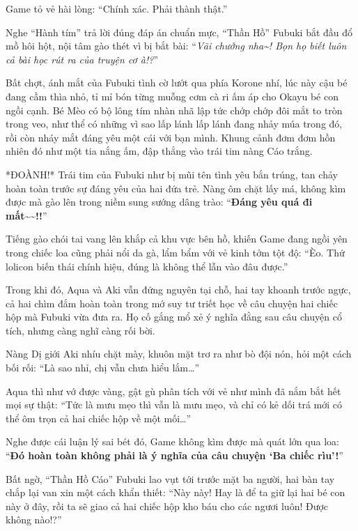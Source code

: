 \documentclass[../main.tex]{subfiles}
\begin{document}
Game tỏ vẻ hài lòng: ``Chính xác. Phải thành thật.''

Nghe ``Hành tím'' trả lời đúng đáp án chuẩn mực, ``Thần Hồ'' Fubuki bắt đầu đổ mồ hôi hột, nội tâm gào thét vì bị bắt bài: ``\textit{Vãi chưởng nha\~{}! Bọn họ biết luôn cả bài học rút ra của truyện cơ à!?}''

Bất chợt, ánh mắt của Fubuki tình cờ lướt qua phía Korone nhí, lúc này cậu bé đang cầm thìa nhỏ, tỉ mỉ bón từng muỗng cơm cà ri ấm áp cho Okayu bé con ngồi cạnh. Bé Mèo có bộ lông tím nhàn nhã lập tức chớp chớp đôi mắt to tròn trong veo, như thể có những vì sao lấp lánh lấp lánh đang nhảy múa trong đó, rồi còn nháy mắt đáng yêu một cái với bạn mình. Khung cảnh đơm đơm hồn nhiên đó như một tia nắng ấm, đập thẳng vào trái tim nàng Cáo trắng.


*ĐOÀNH!* Trái tim của Fubuki như bị mũi tên tình yêu bắn trúng, tan chảy hoàn toàn trước sự đáng yêu của hai đứa trẻ. Nàng ôm chặt lấy má, không kìm được mà gào lên trong niềm sung sướng dâng trào: ``\textbf{Đáng yêu quá đi mất\~{}\~{}!!}''

Tiếng gào chói tai vang lên khắp cả khu vực bên hồ, khiến Game đang ngồi yên trong chiếc loa cũng phải nổi da gà, lẩm bẩm với vẻ kinh tởm tột độ: ``Èo. Thứ lolicon biến thái chính hiệu, đúng là không thể lẫn vào đâu được.''

Trong khi đó, Aqua và Aki vẫn đứng nguyên tại chỗ, hai tay khoanh trước ngực, cả hai chìm đắm hoàn toàn trong mớ suy tư triết học về câu chuyện hai chiếc hộp mà Fubuki vừa đưa ra. Họ cố gắng mổ xẻ ý nghĩa đằng sau câu chuyện cổ tích, nhưng càng nghĩ càng rối bời.

Nàng Dị giới Aki nhíu chặt mày, khuôn mặt trơ ra như bò đội nón, hỏi một cách bối rối: ``Là sao nhỉ, chị vẫn chưa hiểu lắm\dots''

Aqua thì như vớ được vàng, gật gù phân tích với vẻ như mình đã nắm bắt hết mọi sự thật: ``Tức là mưu mẹo thì vẫn là mưu mẹo, và chỉ có kẻ dối trá mới có thể ôm trọn cả hai chiếc hộp về một mối\dots''

Nghe được cái luận lý sai bét đó, Game không kìm được mà quát lớn qua loa: ``\textbf{Đó hoàn toàn không phải là ý nghĩa của câu chuyện `Ba chiếc rìu'!}''

Bất ngờ, ``Thần Hồ Cáo'' Fubuki lao vụt tới trước mặt ba người, hai bàn tay chắp lại van xin một cách khẩn thiết: ``Này này! Hay là để ta giữ lại hai bé con này ở đây, rồi ta sẽ giao cả hai chiếc hộp kho báu cho các ngươi luôn! Được không nào!?''
\end{document}
